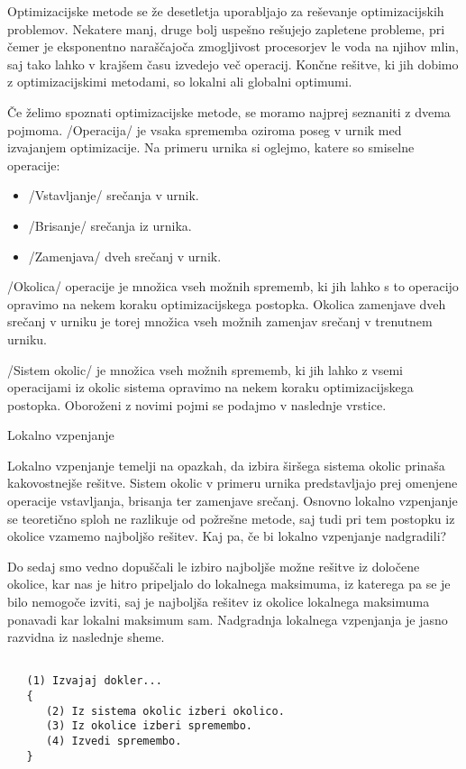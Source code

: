 \documentclass[a4paper, 10pt]{article}
\begin{document}
Optimizacijske metode se že desetletja uporabljajo za reševanje optimizacijskih problemov.
Nekatere manj, druge bolj uspešno rešujejo zapletene probleme, pri čemer je eksponentno
naraščajoča zmogljivost procesorjev le voda na njihov mlin, saj tako lahko v krajšem
času izvedejo več operacij. Končne rešitve, ki jih dobimo z optimizacijskimi metodami,
so lokalni ali globalni optimumi.

Če želimo spoznati optimizacijske metode, se moramo najprej seznaniti z dvema pojmoma.
/Operacija/ je vsaka sprememba oziroma poseg v urnik med izvajanjem optimizacije.
Na primeru urnika si oglejmo, katere so smiselne operacije:

\begin{itemize}
   
      \item /Vstavljanje/ srečanja v urnik.
      \item /Brisanje/ srečanja iz urnika.
      \item /Zamenjava/ dveh srečanj v urnik.
   
\end{itemize}
/Okolica/ operacije je množica vseh možnih sprememb, ki jih lahko s to operacijo
opravimo na nekem koraku optimizacijskega postopka. Okolica zamenjave dveh srečanj v urniku
je torej množica vseh možnih zamenjav srečanj v trenutnem urniku.

/Sistem okolic/ je množica vseh možnih sprememb, ki jih lahko z vsemi operacijami iz
okolic sistema opravimo na nekem koraku optimizacijskega postopka. Oboroženi z novimi pojmi
se podajmo v naslednje vrstice.

Lokalno vzpenjanje

Lokalno vzpenjanje temelji na opazkah, da izbira širšega sistema okolic prinaša kakovostnejše
rešitve. Sistem okolic v primeru urnika predstavljajo prej omenjene operacije vstavljanja,
brisanja ter zamenjave srečanj. Osnovno lokalno vzpenjanje se teoretično sploh ne razlikuje
od požrešne metode, saj tudi pri tem postopku iz okolice vzamemo najboljšo rešitev. Kaj pa,
če bi lokalno vzpenjanje nadgradili?

Do sedaj smo vedno dopuščali le izbiro najboljše možne rešitve iz določene okolice, kar nas
je hitro pripeljalo do lokalnega maksimuma, iz katerega pa se je bilo nemogoče izviti, saj
je najboljša rešitev iz okolice lokalnega maksimuma ponavadi kar lokalni maksimum sam.
Nadgradnja lokalnega vzpenjanja je jasno razvidna iz naslednje sheme.

\begin{verbatim}
   
   (1) Izvajaj dokler...
   {
      (2) Iz sistema okolic izberi okolico.
      (3) Iz okolice izberi spremembo.
      (4) Izvedi spremembo.
   }
   
\end{verbatim}
\end{document}

